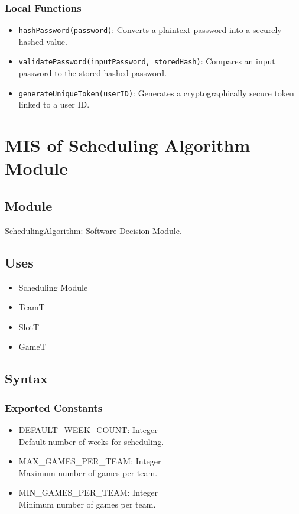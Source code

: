 \documentclass[12pt, titlepage]{article}
\begin{document}
\subsubsection{Local Functions}

\begin{itemize}
    \item \texttt{hashPassword(password)}: Converts a plaintext password into a securely hashed value.
    \item \texttt{validatePassword(inputPassword, storedHash)}: Compares an input password to the stored hashed password.
    \item \texttt{generateUniqueToken(userID)}: Generates a cryptographically secure token linked to a user ID.
\end{itemize}

\newpage

\section{MIS of Scheduling Algorithm Module} \label{SchedulingAlgorithmModule}

\subsection{Module}
SchedulingAlgorithm: Software Decision Module.

\subsection{Uses}
\begin{itemize}
  \item Scheduling Module
  \item TeamT
  \item SlotT
  \item GameT
\end{itemize}

\subsection{Syntax}

\subsubsection{Exported Constants}
\begin{itemize}
  \item DEFAULT\_WEEK\_COUNT: Integer \\ Default number of weeks for scheduling.
  \item MAX\_GAMES\_PER\_TEAM: Integer \\ Maximum number of games per team.
  \item MIN\_GAMES\_PER\_TEAM: Integer \\ Minimum number of games per team.
\end{itemize}
\end{document}
